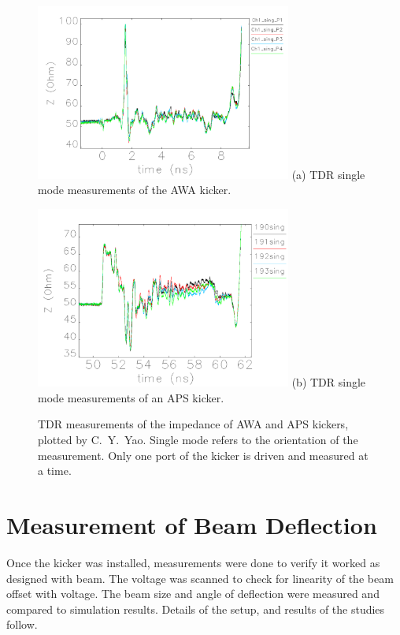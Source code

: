 \documentclass[aps,prab,preprint,groupedaddress,linenumbers]{revtex4-2}
\begin{document}
\begin{figure}
	\begin{center}
		\includegraphics[width=0.75\textwidth]{TDR_AWA_kicker}
		(a) TDR single mode measurements of the AWA kicker.
	\end{center}
	\begin{center}
		\includegraphics[width=0.75\textwidth]{TDR_APS_kicker}
		(b) TDR single mode measurements of an APS kicker.
		\caption{TDR measurements of the impedance of AWA and APS kickers, plotted by C.~Y.~Yao.
			Single mode refers to the orientation of the measurement. 
			Only one port of the kicker is driven and measured at a time. }\label{fig:TDR}		
	\end{center}

\end{figure}


\section{Measurement of Beam Deflection}

Once the kicker was installed, measurements were done to verify it worked as designed with beam.  
The voltage was scanned to check for linearity of the beam offset with voltage.  
The beam size and angle of deflection were measured and compared to simulation results.  
Details of the setup, and results of the studies follow.
\end{document}
